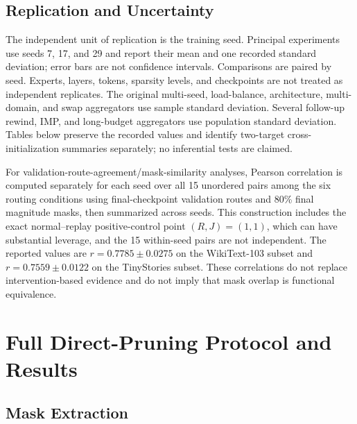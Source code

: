 \documentclass{article}
\begin{document}
\subsection{Replication and Uncertainty}

The independent unit of replication is the training seed. Principal experiments
use seeds 7, 17, and 29 and report their mean and one recorded standard
deviation; error bars are not confidence intervals. Comparisons are paired by
seed. Experts, layers, tokens, sparsity levels, and checkpoints are not treated
as independent replicates. The original multi-seed, load-balance, architecture,
multi-domain, and swap aggregators use sample standard deviation. Several
follow-up rewind, IMP, and long-budget aggregators use population standard
deviation. Tables below preserve the recorded values and identify two-target
cross-initialization summaries separately; no inferential tests are claimed.

For validation-route-agreement/mask-similarity analyses, Pearson correlation is
computed separately for each seed over all 15 unordered pairs among the six
routing conditions using final-checkpoint validation routes and 80\% final
magnitude masks, then summarized across seeds. This
construction includes
the exact normal--replay positive-control point $(R,J)=(1,1)$, which can have
substantial leverage, and the 15 within-seed pairs are not independent. The
reported values are
$r=0.7785\pm0.0275$ on the WikiText-103 subset and
$r=0.7559\pm0.0122$ on the TinyStories subset. These correlations do not replace
intervention-based evidence and do not imply that mask overlap is functional
equivalence.

\section{Full Direct-Pruning Protocol and Results}
\label{app:direct_pruning}

\subsection{Mask Extraction}
\end{document}
